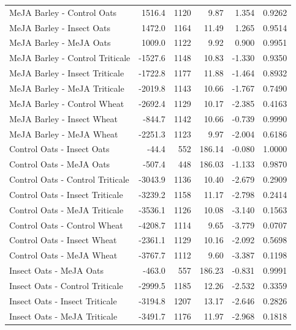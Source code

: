 \documentclass[12pt, letterpaper, ]{report}
\begin{document}
{\begin{center}
\begin{longtable}{lrrrrr}
            MeJA Barley - Control Oats & 1516.4 &1120 & 9.87 & 1.354 & 0.9262 \\
            MeJA Barley - Insect Oats & 1472.0 &1164 & 11.49 & 1.265 & 0.9514 \\
            MeJA Barley - MeJA Oats & 1009.0 &1122 & 9.92 & 0.900 & 0.9951 \\
            MeJA Barley - Control Triticale &-1527.6 &1148 & 10.83 & -1.330 & 0.9350 \\
            MeJA Barley - Insect Triticale &-1722.8 &1177 & 11.88 & -1.464 & 0.8932 \\
            MeJA Barley - MeJA Triticale &-2019.8 &1143 & 10.66 & -1.767 & 0.7490 \\
            MeJA Barley - Control Wheat &-2692.4 &1129 & 10.17 & -2.385 & 0.4163 \\
            MeJA Barley - Insect Wheat & -844.7 &1142 & 10.66 & -0.739 & 0.9990 \\
            MeJA Barley - MeJA Wheat &-2251.3 &1123 & 9.97 & -2.004 & 0.6186 \\
            Control Oats - Insect Oats & -44.4 & 552 & 186.14 & -0.080 & 1.0000 \\
            Control Oats - MeJA Oats & -507.4 & 448 & 186.03 & -1.133 & 0.9870 \\
            Control Oats - Control Triticale &-3043.9 &1136 & 10.40 & -2.679 & 0.2909 \\
            Control Oats - Insect Triticale &-3239.2 &1158 & 11.17 & -2.798 & 0.2414 \\
            Control Oats - MeJA Triticale &-3536.1 &1126 & 10.08 & -3.140 & 0.1563 \\
            Control Oats - Control Wheat &-4208.7 &1114 & 9.65 & -3.779 & 0.0707 \\
            Control Oats - Insect Wheat &-2361.1 &1129 & 10.16 & -2.092 & 0.5698 \\
            Control Oats - MeJA Wheat &-3767.7 &1112 & 9.60 & -3.387 & 0.1198 \\
            Insect Oats - MeJA Oats & -463.0 & 557 & 186.23 & -0.831 & 0.9991 \\
            Insect Oats - Control Triticale &-2999.5 &1185 & 12.26 & -2.532 & 0.3359 \\
            Insect Oats - Insect Triticale &-3194.8 &1207 & 13.17 & -2.646 & 0.2826 \\
            Insect Oats - MeJA Triticale &-3491.7 &1176 & 11.97 & -2.968 & 0.1818 \\

\end{longtable}
\end{center}}
\end{document}
